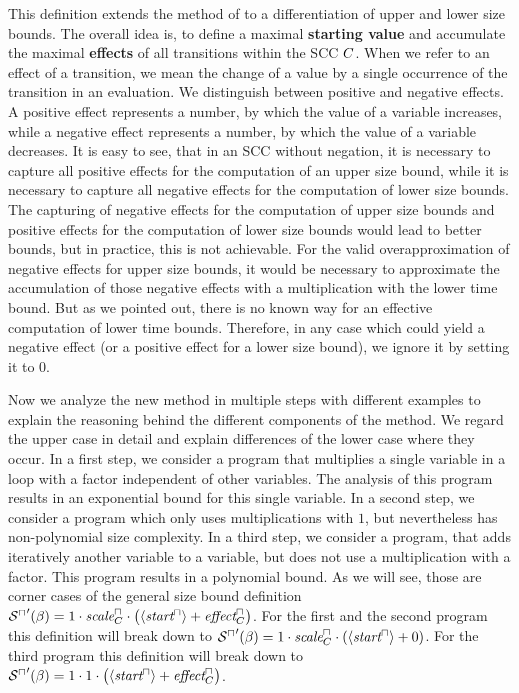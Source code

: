 This definition extends the method of \cite{koat} to a differentiation of upper and lower size bounds.
The overall idea is, to define a maximal \textbf{starting value} and accumulate the maximal \textbf{effects} of all transitions within the SCC $C$.
When we refer to an effect of a transition, we mean the change of a value by a single occurrence of the transition in an evaluation.
We distinguish between positive and negative effects.
A positive effect represents a number, by which the value of a variable increases, while a negative effect represents a number, by which the value of a variable decreases.
It is easy to see, that in an SCC without negation, it is necessary to capture all positive effects for the computation of an upper size bound, while it is necessary to capture all negative effects for the computation of lower size bounds.
The capturing of negative effects for the computation of upper size bounds and positive effects for the computation of lower size bounds would lead to better bounds, but in practice, this is not achievable.
For the valid overapproximation of negative effects for upper size bounds, it would be necessary to approximate the accumulation of those negative effects with a multiplication with the lower time bound.
But as we pointed out, there is no known way for an effective computation of lower time bounds.
Therefore, in any case which could yield a negative effect (or a positive effect for a lower size bound), we ignore it by setting it to $0$.

Now we analyze the new method in multiple steps with different examples to explain the reasoning behind the different components of the method.
We regard the upper case in detail and explain differences of the lower case where they occur.
In a first step, we consider a program that multiplies a single variable in a loop with a factor independent of other variables.
The analysis of this program results in an exponential bound for this single variable.
In a second step, we consider a program which only uses multiplications with $1$, but nevertheless has non-polynomial size complexity.
In a third step, we consider a program, that adds iteratively another variable to a variable, but does not use a multiplication with a factor.
This program results in a polynomial bound.
As we will see, those are corner cases of the general size bound definition ${\mathcal{S}^\sqcap}'(\beta) = 1 \cdot \emph{scale}^\sqcap_C \cdot \left( \left\langle \emph{start}^\sqcap \right\rangle + \emph{effect}^\sqcap_C \right)$.
For the first and the second program this definition will break down to ${\mathcal{S}^\sqcap}'(\beta) = 1 \cdot \emph{scale}^\sqcap_C \cdot \left( \left\langle \emph{start}^\sqcap \right\rangle + 0 \right)$.
For the third program this definition will break down to ${\mathcal{S}^\sqcap}'(\beta) = 1 \cdot 1 \cdot \left( \left\langle \emph{start}^\sqcap \right\rangle + \emph{effect}^\sqcap_C \right)$.

